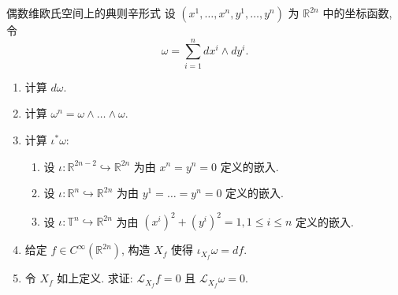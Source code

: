 \documentclass[../main.tex]{subfiles}
\begin{document}
\begin{exercise}{偶数维欧氏空间上的典则辛形式}{}
设 $(x^1, \dots, x^n, y^1, \dots, y^n)$ 为 $\mathbb{R}^{2n}$ 中的坐标函数, 令
\[
\omega = \sum_{i=1}^n dx^i \wedge dy^i.
\]
\begin{enumerate}
\item 计算 $d\omega$.
\item 计算 $\omega^n = \omega \wedge \dots \wedge \omega$.
\item 计算 $\iota^*\omega$:
\begin{enumerate}
\item 设 $\iota: \mathbb{R}^{2n-2} \hookrightarrow \mathbb{R}^{2n}$ 为由 $x^n = y^n = 0$ 定义的嵌入.
\item 设 $\iota: \mathbb{R}^n \hookrightarrow \mathbb{R}^{2n}$ 为由 $y^1 = \dots = y^n = 0$ 定义的嵌入.
\item 设 $\iota: \mathbb{T}^n \hookrightarrow \mathbb{R}^{2n}$ 为由 $(x^i)^2 + (y^i)^2 = 1, 1 \leqslant i \leqslant n$ 定义的嵌入.
\end{enumerate}
\item 给定 $f \in C^\infty(\mathbb{R}^{2n})$, 构造 $X_f$ 使得 $\iota_{X_f}\omega = df$.
\item 令 $X_f$ 如上定义. 求证: $\mathcal{L}_{X_f}f = 0$ 且 $\mathcal{L}_{X_f}\omega = 0$.
\end{enumerate}
\end{exercise}
\end{document}
